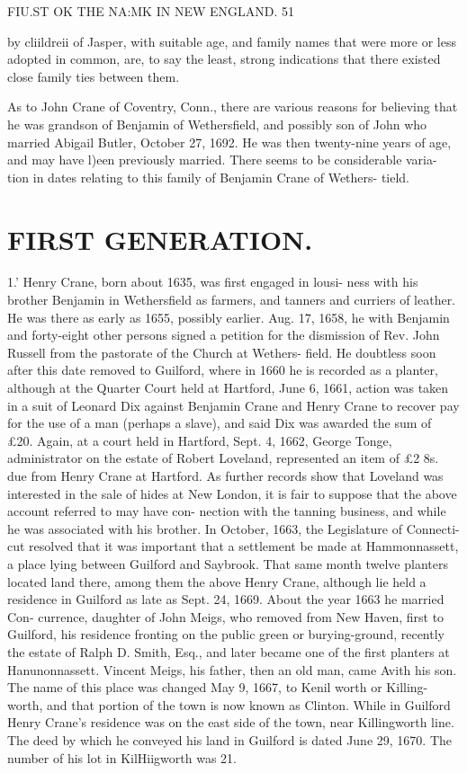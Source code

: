 FIU.ST OK THE NA:MK IN NEW ENGLAND. 51 

by cliildreii of Jasper, with suitable age, and family names that 
were more or less adopted in common, are, to say the least, 
strong indications that there existed close family ties between 
them. 

As to John Crane of Coventry, Conn., there are various reasons 
for believing that he was grandson of Benjamin of Wethersfield, 
and possibly son of John who married Abigail Butler, October 
27, 1692. He was then twenty-nine years of age, and may have 
l)een previously married. There seems to be considerable varia- 
tion in dates relating to this family of Benjamin Crane of Wethers- 
tield. 



\section{FIRST GENERATION.}


1.' Henry Crane, born about 1635, was first engaged in lousi- 
ness with his brother Benjamin in Wethersfield as farmers, and 
tanners and curriers of leather. He was there as early as 
1655, possibly earlier. Aug. 17, 1658, he with Benjamin and 
forty-eight other persons signed a petition for the dismission of 
Rev. John Russell from the pastorate of the Church at Wethers- 
field. He doubtless soon after this date removed to Guilford, 
where in 1660 he is recorded as a planter, although at the 
Quarter Court held at Hartford, June 6, 1661, action was taken 
in a suit of Leonard Dix against Benjamin Crane and Henry 
Crane to recover pay for the use of a man (perhaps a slave), and 
said Dix was awarded the sum of £20. Again, at a court held 
in Hartford, Sept. 4, 1662, George Tonge, administrator on the 
estate of Robert Loveland, represented an item of £2 8s. due 
from Henry Crane at Hartford. As further records show that 
Loveland was interested in the sale of hides at New London, it is 
fair to suppose that the above account referred to may have con- 
nection with the tanning business, and while he was associated 
with his brother. In October, 1663, the Legislature of Connecti- 
cut resolved that it was important that a settlement be made at 
Hammonnassett, a place lying between Guilford and Saybrook. 
That same month twelve planters located land there, among them 
the above Henry Crane, although lie held a residence in Guilford 
as late as Sept. 24, 1669. About the year 1663 he married Con- 
currence, daughter of John Meigs, who removed from New 
Haven, first to Guilford, his residence fronting on the public 
green or burying-ground, recently the estate of Ralph D. Smith, 
Esq., and later became one of the first planters at Hanunonnassett. 
Vincent Meigs, his father, then an old man, came Avith his son. 
The name of this place was changed May 9, 1667, to Kenil worth 
or Killing-worth, and that portion of the town is now known as 
Clinton. While in Guilford Henry Crane's residence was on the 
east side of the town, near Killingworth line. The deed by which 
he conveyed his land in Guilford is dated June 29, 1670. The 
number of his lot in KilHiigworth was 21. 

